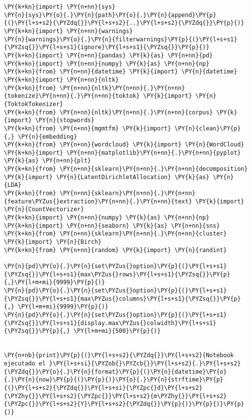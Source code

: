     \begin{tcolorbox}[breakable, size=fbox, boxrule=1pt, pad at break*=1mm,colback=cellbackground, colframe=cellborder]
\begin{Verbatim}[commandchars=\\\{\}]
\PY{k+kn}{import} \PY{n+nn}{sys}
\PY{n}{sys}\PY{o}{.}\PY{n}{path}\PY{o}{.}\PY{n}{append}\PY{p}{(}\PY{l+s+s2}{\PYZdq{}}\PY{l+s+s2}{..}\PY{l+s+s2}{\PYZdq{}}\PY{p}{)}
\PY{k+kn}{import} \PY{n+nn}{warnings}
\PY{n}{warnings}\PY{o}{.}\PY{n}{filterwarnings}\PY{p}{(}\PY{l+s+s1}{\PYZsq{}}\PY{l+s+s1}{ignore}\PY{l+s+s1}{\PYZsq{}}\PY{p}{)}
\PY{k+kn}{import} \PY{n+nn}{pandas} \PY{k}{as} \PY{n+nn}{pd}
\PY{k+kn}{import} \PY{n+nn}{numpy} \PY{k}{as} \PY{n+nn}{np}
\PY{k+kn}{from} \PY{n+nn}{datetime} \PY{k}{import} \PY{n}{datetime}
\PY{k+kn}{import} \PY{n+nn}{nltk}
\PY{k+kn}{from} \PY{n+nn}{nltk}\PY{n+nn}{.}\PY{n+nn}{tokenize}\PY{n+nn}{.}\PY{n+nn}{toktok} \PY{k}{import} \PY{n}{ToktokTokenizer}
\PY{k+kn}{from} \PY{n+nn}{nltk}\PY{n+nn}{.}\PY{n+nn}{corpus} \PY{k}{import} \PY{n}{stopwords}
\PY{k+kn}{from} \PY{n+nn}{mgmtfm} \PY{k}{import} \PY{n}{clean}\PY{p}{,} \PY{n}{embedding}
\PY{k+kn}{from} \PY{n+nn}{wordcloud} \PY{k}{import} \PY{n}{WordCloud}
\PY{k+kn}{import} \PY{n+nn}{matplotlib}\PY{n+nn}{.}\PY{n+nn}{pyplot} \PY{k}{as} \PY{n+nn}{plt}
\PY{k+kn}{from} \PY{n+nn}{sklearn}\PY{n+nn}{.}\PY{n+nn}{decomposition} \PY{k}{import} \PY{n}{LatentDirichletAllocation} \PY{k}{as} \PY{n}{LDA}
\PY{k+kn}{from} \PY{n+nn}{sklearn}\PY{n+nn}{.}\PY{n+nn}{feature\PYZus{}extraction}\PY{n+nn}{.}\PY{n+nn}{text} \PY{k}{import} \PY{n}{CountVectorizer}
\PY{k+kn}{import} \PY{n+nn}{numpy} \PY{k}{as} \PY{n+nn}{np}
\PY{k+kn}{import} \PY{n+nn}{seaborn} \PY{k}{as} \PY{n+nn}{sns}
\PY{k+kn}{from} \PY{n+nn}{sklearn}\PY{n+nn}{.}\PY{n+nn}{cluster} \PY{k}{import} \PY{n}{Birch} 
\PY{k+kn}{from} \PY{n+nn}{random} \PY{k}{import} \PY{n}{randint}

\PY{n}{pd}\PY{o}{.}\PY{n}{set\PYZus{}option}\PY{p}{(}\PY{l+s+s1}{\PYZsq{}}\PY{l+s+s1}{max\PYZus{}rows}\PY{l+s+s1}{\PYZsq{}}\PY{p}{,}\PY{l+m+mi}{9999}\PY{p}{)}
\PY{n}{pd}\PY{o}{.}\PY{n}{set\PYZus{}option}\PY{p}{(}\PY{l+s+s1}{\PYZsq{}}\PY{l+s+s1}{max\PYZus{}columns}\PY{l+s+s1}{\PYZsq{}}\PY{p}{,} \PY{l+m+mi}{9999}\PY{p}{)}
\PY{n}{pd}\PY{o}{.}\PY{n}{set\PYZus{}option}\PY{p}{(}\PY{l+s+s1}{\PYZsq{}}\PY{l+s+s1}{display.max\PYZus{}colwidth}\PY{l+s+s1}{\PYZsq{}}\PY{p}{,} \PY{l+m+mi}{500}\PY{p}{)}


\PY{n+nb}{print}\PY{p}{(}\PY{l+s+s2}{\PYZdq{}}\PY{l+s+s2}{Notebook ejecutado el }\PY{l+s+si}{\PYZob{}\PYZcb{}}\PY{l+s+s2}{.}\PY{l+s+s2}{\PYZdq{}}\PY{o}{.}\PY{n}{format}\PY{p}{(}\PY{n}{datetime}\PY{o}{.}\PY{n}{now}\PY{p}{(}\PY{p}{)}\PY{o}{.}\PY{n}{strftime}\PY{p}{(}\PY{l+s+s2}{\PYZdq{}}\PY{l+s+si}{\PYZpc{}d}\PY{l+s+s2}{\PYZhy{}}\PY{l+s+s2}{\PYZpc{}}\PY{l+s+s2}{m\PYZhy{}}\PY{l+s+s2}{\PYZpc{}}\PY{l+s+s2}{Y}\PY{l+s+s2}{\PYZdq{}}\PY{p}{)}\PY{p}{)}\PY{p}{)}
\end{Verbatim}
\end{tcolorbox}

